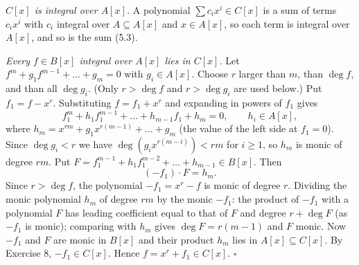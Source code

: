 \documentclass[11pt]{article}
\begin{document}
\pf
\emph{$C[x]$ is integral over $A[x]$.} A polynomial $\sum c_ix^i\in C[x]$ is a sum of terms $c_ix^i$ with $c_i$ integral over $A\subseteq A[x]$ and $x\in A[x]$, so each term is integral over $A[x]$, and so is the sum (5.3).

\emph{Every $f\in B[x]$ integral over $A[x]$ lies in $C[x]$.} Let $f^m+g_1f^{m-1}+\dots+g_m=0$ with $g_i\in A[x]$. Choose $r$ larger than $m$, than $\deg f$, and than all $\deg g_i$. (Only $r>\deg f$ and $r>\deg g_i$ are used below.) Put $f_1=f-x^r$. Substituting $f=f_1+x^r$ and expanding in powers of $f_1$ gives
\[
f_1^m+h_1f_1^{m-1}+\dots+h_{m-1}f_1+h_m=0,\qquad h_i\in A[x],
\]
where $h_m=x^{rm}+g_1x^{r(m-1)}+\dots+g_m$ (the value of the left side at $f_1=0$). Since $\deg g_i<r$ we have $\deg(g_ix^{r(m-i)})<rm$ for $i\ge1$, so $h_m$ is monic of degree $rm$. Put $F=f_1^{m-1}+h_1f_1^{m-2}+\dots+h_{m-1}\in B[x]$. Then
\[
(-f_1)\cdot F=h_m .
\]
Since $r>\deg f$, the polynomial $-f_1=x^r-f$ is monic of degree $r$. Dividing the monic polynomial $h_m$ of degree $rm$ by the monic $-f_1$: the product of $-f_1$ with a polynomial $F$ has leading coefficient equal to that of $F$ and degree $r+\deg F$ (as $-f_1$ is monic); comparing with $h_m$ gives $\deg F=r(m-1)$ and $F$ monic. Now $-f_1$ and $F$ are monic in $B[x]$ and their product $h_m$ lies in $A[x]\subseteq C[x]$. By Exercise 8, $-f_1\in C[x]$. Hence $f=x^r+f_1\in C[x]$. \hfill$\square$
\end{document}
